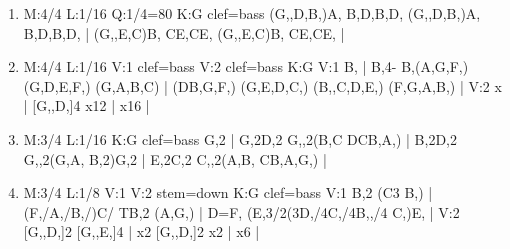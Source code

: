 \documentclass[a4paper,twoside]{article}
\begin{document}
%
%
\large
\settowidth{\titlelen}{Allemande}
\addtolength{\titlelen}{0.5em}
\setlength{\titleseplen}{1cm}
\begin{enumerate}
  \item {}
\begin{abcsvg}
  M:4/4
  L:1/16
  Q:1/4=80
  K:G clef=bass
  (G,,D,B,)A, B,D,B,D, (G,,D,B,)A, B,D,B,D, |
  (G,,E,C)B, CE,CE, (G,,E,C)B, CE,CE, |
\end{abcsvg}
\makebox[2cm][l]{ \dotfill\ \pageref{Iprelude}}
\par\vspace{\titleseplen}

  \item {}
\begin{abcsvg}
  M:4/4
  L:1/16
  V:1 clef=bass
  V:2 clef=bass
  K:G
  V:1
  B, |
  B,4- B,(A,G,F,) (G,D,E,F,) (G,A,B,C) |
  (DB,G,F,) (G,E,D,C,) (B,,C,D,E,) (F,G,A,B,) |
  V:2
  x |
  [G,,D,]4 x12 |
  x16 |
\end{abcsvg}
\makebox[2cm][l]{ \dotfill\ \pageref{Iallemande}}
\par\vspace{\titleseplen}

  \item {}
\begin{abcsvg}
  M:3/4
  L:1/16
  K:G clef=bass
  G,2 |
  G,2D,2 G,,2(B,C DCB,A,) |
  B,2D,2 G,,2(G,A, B,2)G,2 |
  E,2C,2 C,,2(A,B, CB,A,G,) |
\end{abcsvg}
\makebox[2cm][l]{ \dotfill\ \pageref{Icourante}}
\par\vspace{\titleseplen}

  \item {}
\begin{abcsvg}
  M:3/4
  L:1/8
  V:1
  V:2 stem=down
  K:G clef=bass
  V:1
  B,2 (C3 B,) |
  (F,/A,/B,/)C/ TB,2 (A,G,) |
  D=F, (E,3/2(3D,/4C,/4B,,/4 C,)E, |
  V:2
  [G,,D,]2 [G,,E,]4 |
  x2 [G,,D,]2 x2 |
  x6 |
\end{abcsvg}
\makebox[2cm][l]{ \dotfill\ \pageref{Isarabande}}
\par\vspace{\titleseplen}


\end{enumerate}
\end{document}
